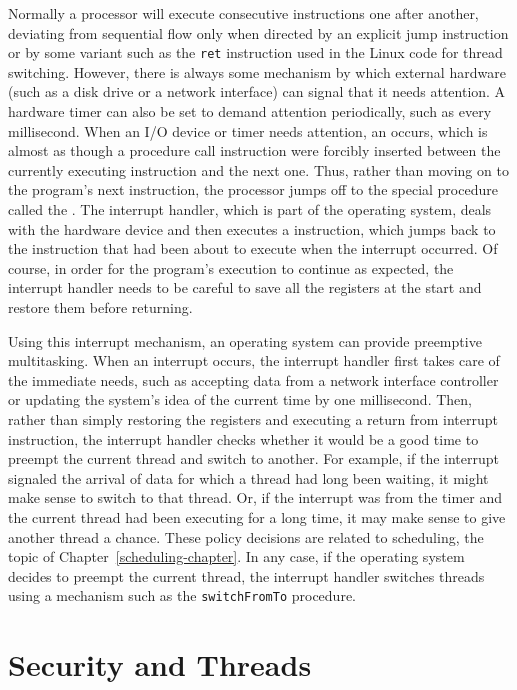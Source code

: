 Normally a processor will execute consecutive instructions one after
another, deviating from sequential flow only when directed by an
explicit jump instruction or by some variant such as the \verb|ret|
instruction used in the Linux code for thread switching.
However, there is always some mechanism by which external hardware
(such as a disk drive or a network interface) can signal that it needs
attention.
A hardware timer can also be set to demand attention periodically,
such as every millisecond.
When an I/O device or timer needs attention, an  occurs, which is almost as
though a procedure call instruction were forcibly inserted between the
currently executing instruction and the next one.  Thus, rather than
moving on to the program's next instruction, the processor jumps off
to the special procedure called the .  The interrupt handler, which is part of the operating
system, deals with the hardware device and then executes a  instruction, which jumps back to the instruction that
had been about to execute when the interrupt occurred.  Of course, in
order for the program's execution to continue as expected, the
interrupt handler needs to be careful to save all the registers at the
start and restore them before returning.

Using this interrupt mechanism, an operating system can provide
preemptive multitasking.  When an interrupt occurs, the interrupt
handler first takes care of the immediate needs, such as
accepting data from a network interface controller or updating the
system's idea of the current time by one millisecond.  Then,
rather than simply restoring the registers and executing a return from
interrupt instruction, the interrupt handler checks whether it would
be a good time to preempt the current thread and switch to another.
For example, if the interrupt signaled the arrival of data for which a
thread had long been waiting, it might make sense to switch to
that thread.  Or, if the interrupt was from the timer and the current
thread had been executing for a long time, it may make sense to give
another thread a chance.  These policy decisions are related to
scheduling, the topic of Chapter~\ref{scheduling-chapter}.  In any case, if the
operating system decides to preempt the current thread, the interrupt
handler switches threads using a
mechanism such as the \verb|switchFromTo| procedure.

\section{Security and Threads}

